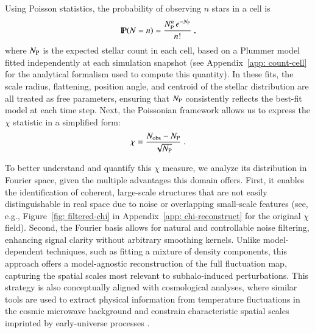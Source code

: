 \documentclass[fleqn,usenatbib]{mnras}
\newcommand{\probP}{\text{I\kern-0.15em P}}
\begin{document}
Using Poisson statistics, the probability of observing $n$ stars in a cell is
\begin{equation}
\probP(N = n) = \frac{N_{\rm P}^{n} \, e^{-N_{\rm P}}}{n!} \ ,
\end{equation}
where $N_{\rm P}$ is the expected stellar count in each cell, based on a Plummer model fitted independently at each simulation snapshot (see Appendix~\ref{app: count-cell} for the analytical formalism used to compute this quantity). In these fits, the scale radius, flattening, position angle, and centroid of the stellar distribution are all treated as free parameters, ensuring that $N_{\rm P}$ consistently reflects the best-fit model at each time step. Next, the Poissonian framework allows us to express the $\chi$ statistic in a simplified form:
\begin{equation} \label{eq: chi-measure-poisson}
\chi = \frac{N_{\rm obs} - N_{\rm P}}{\sqrt{N_{\rm P}}} \ .
\end{equation}

To better understand and quantify this $\chi$ measure, we analyze its distribution in Fourier space, given the multiple advantages this domain offers. First, it enables the identification of coherent, large-scale structures that are not easily distinguishable in real space due to noise or overlapping small-scale features (see, e.g., Figure~\ref{fig: filtered-chi} in Appendix~\ref{app: chi-reconstruct} for the original $\chi$ field). Second, the Fourier basis allows for natural and controllable noise filtering, enhancing signal clarity without arbitrary smoothing kernels. Unlike model-dependent techniques, such as fitting a mixture of density components, this approach offers a model-agnostic reconstruction of the full fluctuation map, capturing the spatial scales most relevant to subhalo-induced perturbations.
This strategy is also conceptually aligned with cosmological analyses, where similar tools are used to extract physical information from temperature fluctuations in the cosmic microwave background and constrain characteristic spatial scales imprinted by early-universe processes \citep[e.g.][]{Bond&Efstathiou84,Plank20-powerspectra}.
\end{document}
